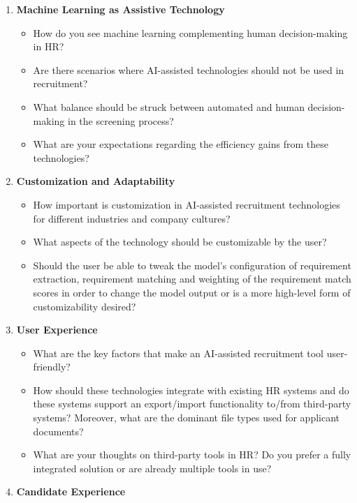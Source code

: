 \documentclass[draft,final]{thesisclass} %
\begin{document}
\begin{enumerate}
\begin{itemize}
    \end{itemize}
    \item \textbf{Machine Learning as Assistive Technology}
    \begin{itemize}
        \item How do you see machine learning complementing human decision-making in \acs{HR}?
        \item Are there scenarios where \acs{AI}-assisted technologies should not be used in recruitment?
        \item What balance should be struck between automated and human decision-making in the screening process?
        \item What are your expectations regarding the efficiency gains from these technologies?
    \end{itemize}
    \item \textbf{Customization and Adaptability}
    \begin{itemize}
        \item How important is customization in \acs{AI}-assisted recruitment technologies for different industries and company cultures?
        \item What aspects of the technology should be customizable by the user?
        \item Should the user be able to tweak the model's configuration of requirement extraction, requirement matching and weighting of the requirement match scores in order to change the model output or is a more high-level form of customizability desired?
    \end{itemize}
    \item \textbf{User Experience}
    \begin{itemize}
        \item What are the key factors that make an \acs{AI}-assisted recruitment tool user-friendly?
        \item How should these technologies integrate with existing \acs{HR} systems and do these systems support an export/import functionality to/from third-party systems? Moreover, what are the dominant file types used for applicant documents?
        \item What are your thoughts on third-party tools in HR? Do you prefer a fully integrated solution or are already multiple tools in use?
    \end{itemize}
    \item \textbf{Candidate Experience}
    \begin{itemize}

\end{itemize}
\end{enumerate}
\end{document}
